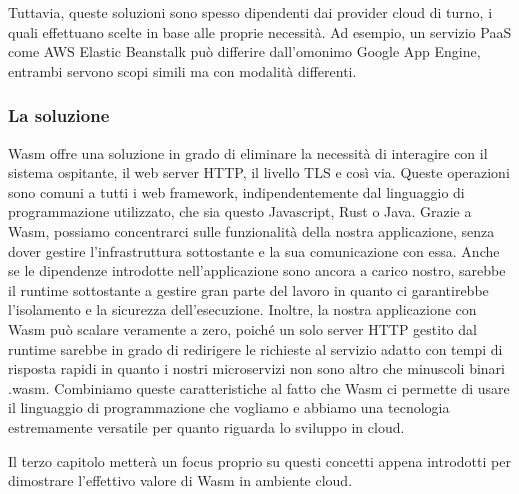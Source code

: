Tuttavia, queste soluzioni sono spesso dipendenti dai provider cloud di turno, i quali effettuano scelte in base alle
proprie necessità. Ad esempio, un servizio PaaS come AWS Elastic Beanstalk può differire dall'omonimo Google App Engine,
entrambi servono scopi simili ma con modalità differenti.

\subsubsection{La soluzione}
Wasm offre una soluzione in grado di eliminare la necessità di interagire con il sistema ospitante, il web server HTTP,
il livello TLS e così via. Queste operazioni sono comuni a tutti i web framework, indipendentemente dal linguaggio di
programmazione utilizzato, che sia questo Javascript, Rust o Java. Grazie a Wasm, possiamo concentrarci sulle
funzionalità della nostra applicazione, senza dover gestire l'infrastruttura sottostante e la sua comunicazione con
essa. Anche se le dipendenze introdotte nell'applicazione sono ancora a carico nostro, sarebbe il runtime sottostante a
gestire gran parte del lavoro in quanto ci garantirebbe l'isolamento e la sicurezza dell'esecuzione. Inoltre, la nostra
applicazione con Wasm può scalare veramente a zero, poiché un solo server HTTP gestito dal runtime sarebbe in grado di
redirigere le richieste al servizio adatto con tempi di risposta rapidi in quanto i nostri microservizi non sono altro
che minuscoli binari .wasm. Combiniamo queste caratteristiche al fatto che Wasm ci permette di usare il linguaggio di
programmazione che vogliamo e abbiamo una tecnologia estremamente versatile per quanto riguarda lo sviluppo in cloud.

Il terzo capitolo metterà un focus proprio su questi concetti appena introdotti per dimostrare l'effettivo valore di
Wasm in ambiente cloud.